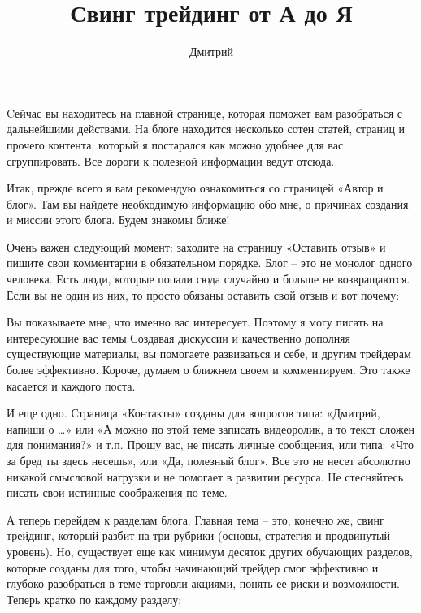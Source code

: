 \documentclass[a5paper]{article}
\begin{document}
\title{Свинг трейдинг от А до Я}
\author{Дмитрий}
\date{}
\maketitle{}
\tableofcontents

Cейчас вы находитесь на главной странице, которая поможет вам разобраться с дальнейшими действами. На блоге находится несколько сотен статей, страниц и прочего контента, который я постарался как можно удобнее для вас сгруппировать. Все дороги к полезной информации ведут отсюда.

Итак, прежде всего я вам рекомендую ознакомиться со страницей «Автор и блог». Там вы найдете необходимую информацию обо мне, о причинах создания и миссии этого блога. Будем знакомы ближе!

Очень важен следующий момент: заходите на страницу «Оставить отзыв» и пишите свои комментарии в обязательном порядке. Блог – это не монолог одного человека. Есть люди, которые попали сюда случайно и больше не возвращаются. Если вы не один из них, то просто обязаны оставить свой отзыв и вот почему:

Вы показываете мне, что именно вас интересует. Поэтому я могу писать на интересующие вас темы
Создавая дискуссии и качественно дополняя существующие материалы, вы помогаете развиваться и себе, и другим трейдерам более эффективно.
Короче, думаем о ближнем своем и комментируем. Это также касается и каждого поста.

И еще одно. Страница «Контакты» созданы для вопросов типа: «Дмитрий, напиши о …» или «А можно по этой теме записать видеоролик, а то текст сложен для понимания?» и т.п. Прошу вас, не писать личные сообщения, или типа: «Что за бред ты здесь несешь», или «Да, полезный блог». Все это не несет абсолютно никакой смысловой нагрузки и не помогает в развитии ресурса. Не стесняйтесь писать свои истинные соображения по теме.

А теперь перейдем к разделам блога. Главная тема – это, конечно же, свинг трейдинг, который разбит на три рубрики (основы, стратегия и продвинутый уровень). Но, существует еще как минимум десяток других обучающих разделов, которые созданы для того, чтобы начинающий трейдер смог эффективно и глубоко разобраться в теме торговли акциями, понять ее риски и возможности. Теперь кратко по каждому разделу:
\end{document}
